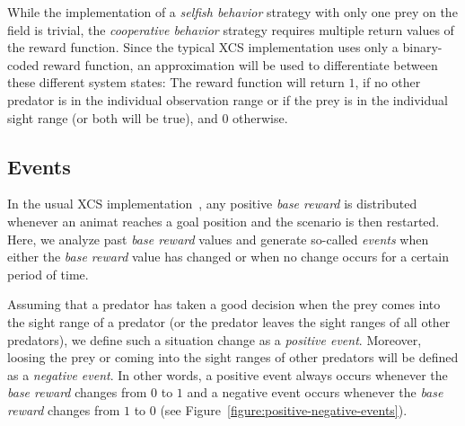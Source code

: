 While the implementation of a \emph{selfish behavior} strategy with only one prey on the field is trivial, the \emph{cooperative behavior} strategy requires multiple return values of the reward function. Since the typical XCS implementation \cite{BW02} uses only a binary-coded reward function, an approximation will be used to differentiate between these different system states: The reward function will return $1$, if no other predator is in the individual observation range or if the prey is in the individual sight range (or both will be true), and $0$ otherwise. 




\subsection{Events}
\label{subsection:events}

In the usual XCS implementation~\cite{BW02}, any positive \emph{base reward} is distributed whenever an animat reaches a goal position and the scenario is then restarted. Here, we analyze past \emph{base reward} values and generate so-called \emph{events} when either the \emph{base reward} value has changed or when no change occurs for a certain period of time.

Assuming that a predator has taken a good decision when the prey comes into the sight range of a predator (or the predator leaves the sight ranges of all other predators), we define such a situation change as a \emph{positive event}. Moreover, loosing the prey or coming into the sight ranges of other predators will be defined as a \emph{negative event}. In other words, a positive event always occurs whenever the \emph{base reward} changes from $0$ to $1$ and a negative event occurs whenever the \emph{base reward} changes from $1$ to $0$ (see Figure~\ref{figure:positive-negative-events}).

